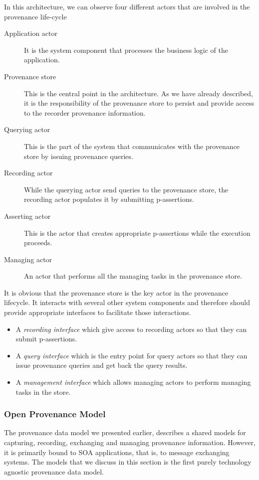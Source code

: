In this architecture, we can observe four different actors that are involved in the provenance life-cycle

\begin{description}
  \item[Application actor]
        It is the system component that processes the business logic of the application.
  \item[Provenance store]
        This is the central point in the architecture. As we have already described, it is the responsibility of the provenance store to persist and provide access to the recorder provenance information.
  \item[Querying actor]
        This is the part of the system that communicates with the provenance store by issuing provenance queries.
  \item[Recording actor]
        While the querying actor send queries to the provenance store, the recording actor populates it by submitting p-assertions.
  \item[Asserting actor]
        This is the actor that creates appropriate p-assertions while the execution proceeds.
  \item[Managing actor]
        An actor that performs all the managing tasks in the provenance store.
\end{description}

It is obvious that the provenance store is the key actor in the provenance lifecycle. It interacts with several other system components and therefore should provide appropriate interfaces to facilitate those interactions.

\begin{itemize}
  \item
        A \emph{recording interface} which give access to recording actors so that they can submit p-assertions.
  \item
        A \emph{query interface} which is the entry point for query actors so that they can issue provenance queries and get back the query results.
  \item
        A \emph{management interface} which allows managing actors to perform managing tasks in the store.
\end{itemize}


\subsubsection{Open Provenance Model}
The provenance data model we presented earlier, describes a shared models for capturing, recording, exchanging and managing provenance information. However, it is primarily bound to SOA applications, that is, to message exchanging systems. The models that we discuss in this section is the first purely technology agnostic provenance data model.

